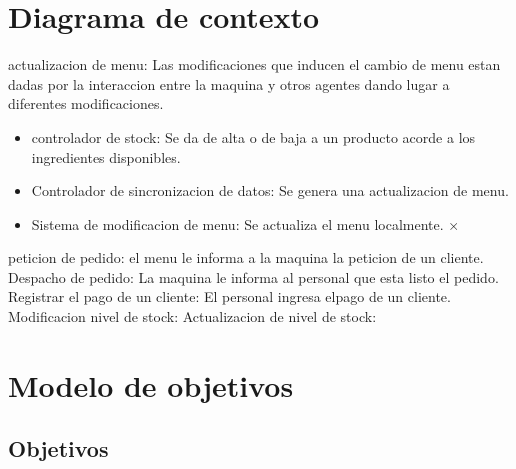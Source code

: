 \documentclass[a4paper,10pt]{article}
\begin{document}
\section*{Diagrama de contexto}
actualizacion de menu: Las modificaciones que inducen el cambio de menu estan dadas por la interaccion entre la maquina y otros agentes dando lugar a diferentes modificaciones.
\begin{itemize}
  \item controlador de stock: Se da de alta o de baja a un producto acorde a los ingredientes disponibles.
  \item Controlador de sincronizacion de datos: Se genera una actualizacion de menu.
  \item Sistema de modificacion de menu: Se actualiza el menu localmente.
 ×
\end{itemize}
peticion de pedido: el menu le informa a la maquina la peticion de un cliente.
Despacho de pedido: La maquina le informa al personal que esta listo el pedido.
Registrar el pago de un cliente: El personal ingresa elpago de un cliente.
Modificacion nivel de stock:
Actualizacion de nivel de stock:


\section*{Modelo de objetivos}
\subsection*{Objetivos}
\noindent
\end{document}

